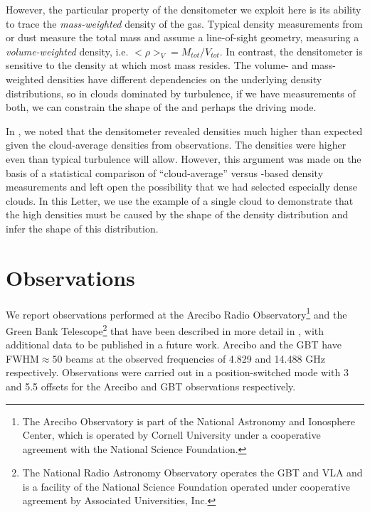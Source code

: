 However, the particular property of the \formaldehyde densitometer we exploit
here is its ability to trace the \emph{mass-weighted} density of the gas.
Typical density measurements from \thirteenco or dust measure the total mass
and assume a line-of-sight geometry, measuring a \emph{volume-weighted}
density, i.e. $<\rho>_V = M_{tot}/V_{tot}$.  In contrast, the \formaldehyde
densitometer is sensitive to the density at which most mass resides.
The volume- and mass- weighted densities have different dependencies on the
underlying density distributions, so in clouds dominated by turbulence, if we
have measurements of both, we can constrain the shape of the \rhoPDF and
perhaps the driving mode.

In \citet{Ginsburg2011a}, we noted that the \formaldehyde densitometer revealed
densities much higher than expected given the cloud-average densities from
\thirteenco observations.  The densities were higher even than typical
turbulence will allow.  However, this argument was made on the basis of a
statistical comparison of ``cloud-average'' versus \formaldehyde-based density
measurements and left open the possibility that we had selected especially
dense clouds.  In this Letter, we use the example of a single cloud to
demonstrate that the high \formaldehyde densities must be caused by the shape
of the density distribution and infer the shape of this distribution.


\section{Observations}
We report \formaldehyde observations performed at the Arecibo Radio
Observatory\footnote{The Arecibo Observatory is part of the National Astronomy
and Ionosphere Center, which is operated by Cornell University under a
cooperative agreement with the National Science Foundation.  } and the Green
Bank Telescope\footnote{ The National Radio Astronomy Observatory operates the
GBT and VLA and is a facility of the National Science Foundation operated under
cooperative agreement by Associated Universities, Inc.  } that have been 
described in more detail in \citet{Ginsburg2011a}, with additional data to be
published in a future work.  Arecibo and the GBT have FWHM$\approx50$\arcsec
beams at the observed frequencies of 4.829 and 14.488 GHz respectively.
Observations were carried out in a position-switched mode with 3 and 5.5\arcmin
offsets for the Arecibo and GBT observations respectively.

